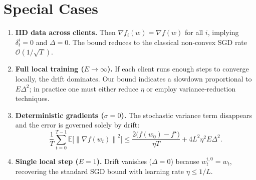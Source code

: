 \documentclass{article}
\newcommand{\E}{\mathbb{E}}
\newcommand{\norm}[1]{\left\lVert#1\right\rVert}
\begin{document}
\section*{Special Cases}
\begin{enumerate}
\item \textbf{IID data across clients.}  Then $\nabla f_i(w)=\nabla f(w)$ for all $i$, implying $\delta_t^{i}=0$ and $\Delta=0$.  
The bound reduces to the classical non‑convex SGD rate $\mathcal{O}(1/\sqrt{T})$.

\item \textbf{Full local training ($E\to\infty$).}  If each client runs enough steps to converge locally, the drift dominates.  
Our bound indicates a slowdown proportional to $E\Delta^2$; in practice one must either reduce $\eta$ or employ variance‑reduction techniques.

\item \textbf{Deterministic gradients ($\sigma=0$).}  The stochastic variance term disappears and the error is governed solely by drift:
\[
\frac{1}{T}\sum_{t=0}^{T-1}\E\!\bigl[\norm{\nabla f(w_t)}^2\bigr]
\le
\frac{2\bigl(f(w_0)-f^\star\bigr)}{\eta T}+4L^2\eta^2E\Delta^2 .
\]

\item \textbf{Single local step ($E=1$).}  Drift vanishes ($\Delta=0$) because $w_{t}^{i,0}=w_t$, recovering the standard SGD bound with learning rate $\eta\le 1/L$.
\end{enumerate}
\end{document}
